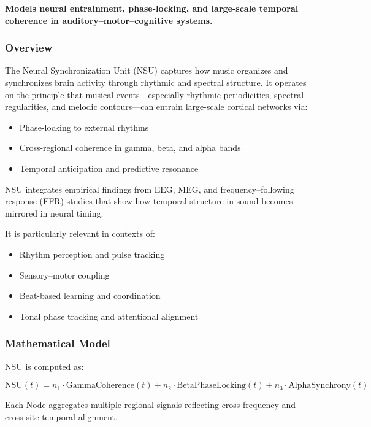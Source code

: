 \documentclass[10pt]{article}
\begin{document}
\textbf{Models neural entrainment, phase-locking, and large-scale temporal coherence in auditory–motor–cognitive systems.}

\subsubsection*{Overview}

The Neural Synchronization Unit (NSU) captures how music organizes and synchronizes brain activity through rhythmic and spectral structure. It operates on the principle that musical events—especially rhythmic periodicities, spectral regularities, and melodic contours—can entrain large-scale cortical networks via:

\begin{itemize}
    \item Phase-locking to external rhythms
    \item Cross-regional coherence in gamma, beta, and alpha bands
    \item Temporal anticipation and predictive resonance
\end{itemize}

NSU integrates empirical findings from EEG, MEG, and frequency–following response (FFR) studies that show how temporal structure in sound becomes mirrored in neural timing.

It is particularly relevant in contexts of:

\begin{itemize}
    \item Rhythm perception and pulse tracking
    \item Sensory–motor coupling
    \item Beat-based learning and coordination
    \item Tonal phase tracking and attentional alignment
\end{itemize}

\subsubsection*{Mathematical Model}

NSU is computed as:

\[
\text{NSU}(t) = n_1 \cdot \text{GammaCoherence}(t) + n_2 \cdot \text{BetaPhaseLocking}(t) + n_3 \cdot \text{AlphaSynchrony}(t)
\]

Each Node aggregates multiple regional signals reflecting cross-frequency and cross-site temporal alignment.
\end{document}
